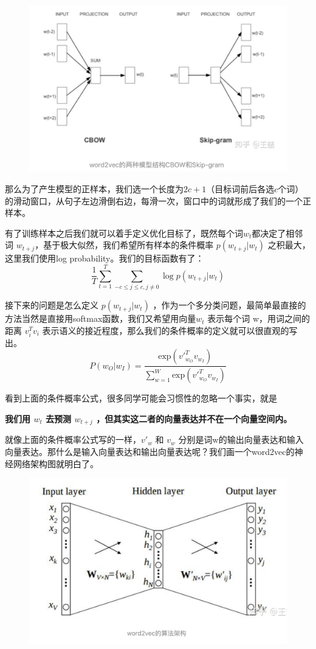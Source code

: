 \documentclass[12pt]{article}
\begin{document}
\begin{figure}[H]
    \centering
    \includegraphics[width=.8\textwidth]{fig/Embedding_Word2vec_Skip-gram_CBOW.png}
\end{figure}

那么为了产生模型的正样本，我们选一个长度为$2c+1$（目标词前后各选$c$个词）的滑动窗口，从句子左边滑倒右边，每滑一次，窗口中的词就形成了我们的一个正样本。

有了训练样本之后我们就可以着手定义优化目标了，既然每个词$w_t$都决定了相邻词 $w_{t+j}$，基于极大似然，我们希望所有样本的条件概率 $p(w_{t+j}|w_t)$ 之积最大，这里我们使用log probability。我们的目标函数有了：
$$
\frac{1}{T} \sum_{t=1}^T\sum_{-c \le j \le c, j \neq 0} \log{p(w_{t+j}|w_t)}
$$

接下来的问题是怎么定义 $p(w_{t+j}|w_t)$ ，作为一个多分类问题，最简单最直接的方法当然是直接用softmax函数，我们又希望用向量$w_t$ 表示每个词 w，用词之间的距离 $v_i^Tv_i$ 表示语义的接近程度，那么我们的条件概率的定义就可以很直观的写出。
$$
P(w_O|w_I) = \frac{\text{exp}({v'}_{w_O}^Tv_{w_I})}{\sum_{w=1}^W\text{exp}({{v'}_{w_O}^Tv_{w_I}})}
$$

看到上面的条件概率公式，很多同学可能会习惯性的忽略一个事实，就是

\textbf{我们用 $w_t$ 去预测 $w_{t+j}$ ，但其实这二者的向量表达并不在一个向量空间内。}

就像上面的条件概率公式写的一样，$v'_w$ 和 $v_w$ 分别是词w的输出向量表达和输入向量表达。那什么是输入向量表达和输出向量表达呢？我们画一个word2vec的神经网络架构图就明白了。
\begin{figure}[H]
    \centering
    \includegraphics[width=.8\textwidth]{fig/Word2Vec_Algorithm_Structure.png}
\end{figure}
\end{document}
